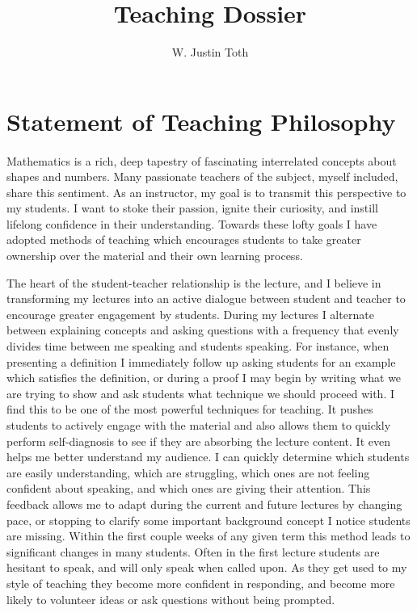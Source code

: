 \documentclass{article}
\title{Teaching Dossier}
\author{W. Justin Toth}
\begin{document}
\maketitle
\newpage
\tableofcontents
\newpage
\section{Statement of Teaching Philosophy}
\paragraph{}
Mathematics is a rich, deep tapestry of fascinating interrelated concepts about shapes and numbers. Many passionate teachers of the subject, myself included, share this sentiment. As an instructor, my goal is to transmit this perspective to my students. I want to stoke their passion, ignite their curiosity, and instill lifelong confidence in their understanding. Towards these lofty goals I have adopted methods of teaching which encourages students to take greater ownership over the material and their own learning process.

The heart of the student-teacher relationship is the lecture, and I believe in transforming my lectures into an active dialogue between student and teacher to encourage greater engagement by students. During my lectures I alternate between explaining concepts and asking questions with a frequency that evenly divides time between me speaking and students speaking. For instance, when presenting a definition I immediately follow up asking students for an example which satisfies the definition, or during a proof I may begin by writing what we are trying to show and ask students what technique we should proceed with. I find this to be one of the most powerful techniques for teaching. It pushes students to actively engage with the material and also allows them to quickly perform self-diagnosis to see if they are absorbing the lecture content. It even helps me better understand my audience. I can quickly determine which students are easily understanding, which are struggling, which ones are not feeling confident about speaking, and which ones are giving their attention. This feedback allows me to adapt during the current and future lectures by changing pace, or stopping to clarify some important background concept I notice students are missing. Within the first couple weeks of any given term this method leads to significant changes in many students. Often in the first lecture students are hesitant to speak, and will only speak when called upon. As they get used to my style of teaching they become more confident in responding, and become more likely to volunteer ideas or ask questions without being prompted.
\end{document}
